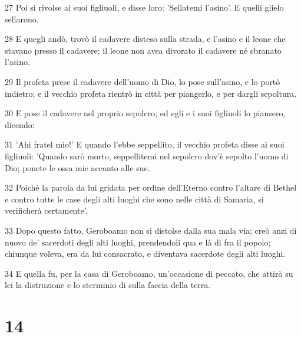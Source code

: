 \par 27 Poi si rivolse ai suoi figliuoli, e disse loro: 'Sellatemi l'asino'. E quelli glielo sellarono.
\par 28 E quegli andò, trovò il cadavere disteso sulla strada, e l'asino e il leone che stavano presso il cadavere; il leone non avea divorato il cadavere né sbranato l'asino.
\par 29 Il profeta prese il cadavere dell'uomo di Dio, lo pose sull'asino, e lo portò indietro; e il vecchio profeta rientrò in città per piangerlo, e per dargli sepoltura.
\par 30 E pose il cadavere nel proprio sepolcro; ed egli e i suoi figliuoli lo piansero, dicendo:
\par 31 'Ahi fratel mio!' E quando l'ebbe seppellito, il vecchio profeta disse ai suoi figliuoli: 'Quando sarò morto, seppellitemi nel sepolcro dov'è sepolto l'uomo di Dio; ponete le ossa mie accanto alle sue.
\par 32 Poiché la parola da lui gridata per ordine dell'Eterno contro l'altare di Bethel e contro tutte le case degli alti luoghi che sono nelle città di Samaria, si verificherà certamente'.
\par 33 Dopo questo fatto, Geroboamo non si distolse dalla sua mala via; creò anzi di nuovo de' sacerdoti degli alti luoghi, prendendoli qua e là di fra il popolo; chiunque voleva, era da lui consacrato, e diventava sacerdote degli alti luoghi.
\par 34 E quella fu, per la casa di Geroboamo, un'occasione di peccato, che attirò su lei la distruzione e lo sterminio di sulla faccia della terra.

\chapter{14}

